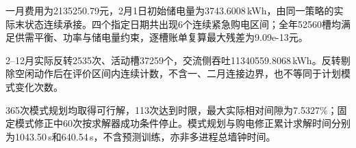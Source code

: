一月费用为2135250.79元，2月1日初始储电量为3743.6008\,kWh，由同一策略的实际末状态连续承接。四个指定日期共出现6个连续紧急购电区间；全年52560槽均满足供需平衡、功率与储电量约束，逐槽账单复算最大残差为9.09e-13元。

2--12月实际反转2535次、活动槽37259个，交流侧吞吐11340559.8068\,kWh。反转剔除空闲动作后在评价区间内连续计数，不含一、二月连接边界，也不等同于计划模式变化次数。

365次模式规划均取得可行解，113次达到时限，最大实际相对间隙为7.5327\%；固定模式修正中60次按求解器成功条件停止。模式规划与购电修正累计求解时间分别为1043.50\,s和640.54\,s，不含预测训练，亦非多进程总墙钟时间。

